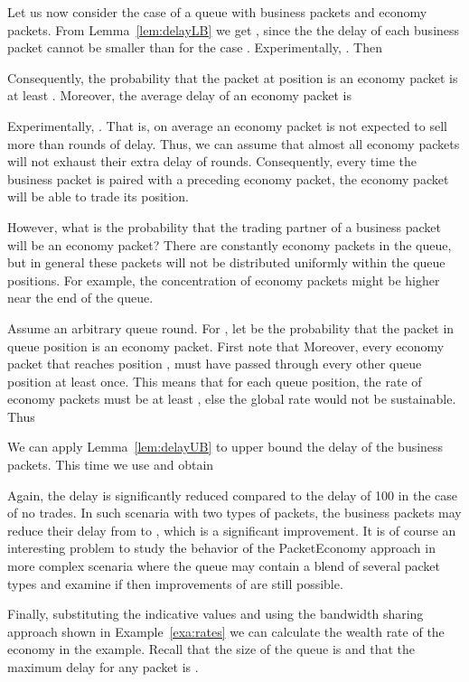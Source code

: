 \documentclass[letterpaper,10pt]{llncs}
\begin{document}
Let us now consider the case of a queue with  business packets and  economy packets.
From Lemma~\ref{lem:delayLB} we get , since the 
the delay of each business packet cannot be smaller than for the case . Experimentally, . Then


Consequently, the probability that the packet at position  is an economy packet is at least .
Moreover, the average delay of an economy packet is 

Experimentally, . That is, on average an economy packet is not expected to sell more than  rounds of delay.
Thus, we can assume that almost all economy packets will not exhaust their extra delay of  rounds.
Consequently, every time the business packet is paired with a preceding economy packet,
the economy packet will be able to trade its position.

However, what is the probability that the trading partner of a business packet 
will be an economy packet? There are constantly  economy packets in
the queue, but in general these packets will not be distributed uniformly within
the  queue positions. For example, the concentration of economy packets might
be higher near the end of the queue.

Assume an arbitrary queue round. 
For , let  be the probability that the packet in queue position 
is an economy packet. First note that 
Moreover, every economy packet that reaches position , must have passed through every other 
queue position at least once. This means that for each queue position, 
the rate of economy packets must be at least ,
else the global rate  would not be sustainable. Thus

We can apply Lemma~\ref{lem:delayUB} to upper bound the delay  
of the business packets. This time we use  and obtain

Again, the delay is significantly reduced compared to the delay of 100 in the case of no trades.
In such scenaria with two types of packets, the business packets may reduce 
their delay from  to , which is a significant improvement.
It is of course an interesting problem to study the behavior 
of the PacketEconomy approach in more complex scenaria
where the queue may contain a blend of several packet types
and examine if then improvements of  are still possible.

Finally, substituting the indicative values  
and using the bandwidth sharing approach shown in Example~\ref{exa:rates}
we can calculate the wealth rate of the economy in the example.
Recall that the size of the queue is  and that the maximum delay for
any packet is .
\end{document}
